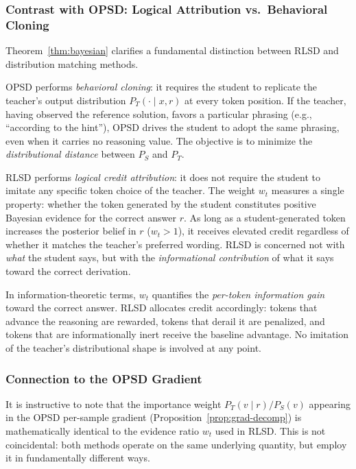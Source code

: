 \documentclass[]{jingdong}
\begin{document}
\subsubsection{Contrast with OPSD: Logical Attribution vs.\ Behavioral Cloning}

Theorem~\ref{thm:bayesian} clarifies a fundamental distinction between RLSD and distribution matching methods.

OPSD performs \textit{behavioral cloning}: it requires the student to replicate the teacher's output distribution $P_T(\cdot \mid x, r)$ at every token position. If the teacher, having observed the reference solution, favors a particular phrasing (e.g., ``according to the hint''), OPSD drives the student to adopt the same phrasing, even when it carries no reasoning value. The objective is to minimize the \textit{distributional distance} between $P_S$ and $P_T$.

RLSD performs \textit{logical credit attribution}: it does not require the student to imitate any specific token choice of the teacher. The weight $w_t$ measures a single property: whether the token generated by the student constitutes positive Bayesian evidence for the correct answer $r$. As long as a student-generated token increases the posterior belief in $r$ ($w_t > 1$), it receives elevated credit regardless of whether it matches the teacher's preferred wording. RLSD is concerned not with \textit{what} the student says, but with the \textit{informational contribution} of what it says toward the correct derivation.

In information-theoretic terms, $w_t$ quantifies the \textit{per-token information gain} toward the correct answer. RLSD allocates credit accordingly: tokens that advance the reasoning are rewarded, tokens that derail it are penalized, and tokens that are informationally inert receive the baseline advantage. No imitation of the teacher's distributional shape is involved at any point.


\subsubsection{Connection to the OPSD Gradient}

It is instructive to note that the importance weight $P_T(v \mid r)/P_S(v)$ appearing in the OPSD per-sample gradient (Proposition~\ref{prop:grad-decomp}) is mathematically identical to the evidence ratio $w_t$ used in RLSD. This is not coincidental: both methods operate on the same underlying quantity, but employ it in fundamentally different ways.
\end{document}
